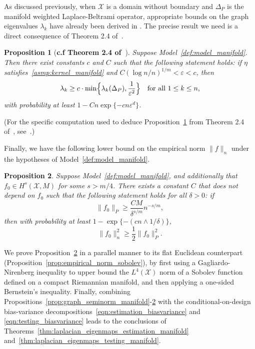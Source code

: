 \documentclass[aos]{imsart}
\theoremstyle{plain}
\newtheorem{proposition}{Proposition}
\theoremstyle{definition}
\theoremstyle{remark}
\newcommand{\mc}[1]{\mathcal{#1}}
\newcommand{\1}{\mathbf{1}}
\begin{document}
As discussed previously, when $\mc{X}$ is a domain without boundary and $\Delta_P$ is the manifold weighted Laplace-Beltrami operator, appropriate bounds on the graph eigenvalues $\lambda_k$ have already been derived in \citep{burago2014,trillos2019,garciatrillos19}. The precise result we need is a direct consequence of Theorem 2.4 of~\citep{calder2019}.
\begin{proposition}[\textbf{c.f Theorem 2.4 of~\citep{calder2019}}]
	\label{prop:graph_eigenvalue_manifold}
	Suppose Model~\ref{def:model_manifold}. Then there exist constants $c$ and $C$ such that the following statement holds: if $\eta$ satisfies~\ref{asmp:kernel_manifold} and $C(\log n/n)^{1/m} < \varepsilon < c$, then
	\begin{equation}
	\label{eqn:graph_eigenvalue_manifold}
	\lambda_k \geq c \cdot \min\Bigl\{\lambda_k(\Delta_P), \frac{1}{\varepsilon^{2}} \Bigr\} \quad \textrm{for all $1 \leq k \leq n$,}
	\end{equation}
	with probability at least $1 - Cn\exp\{-c n\varepsilon^d\}$. 
\end{proposition}
(For the specific computation used to deduce Proposition~\ref{prop:graph_eigenvalue_manifold} from Theorem 2.4 of~\citep{calder2019}, see~\cite{green2021}.)

Finally, we have the following lower bound on the empirical norm $\|f\|_n$ under the hypotheses of Model~\ref{def:model_manifold}. 
\begin{proposition}
	\label{prop:empirical_norm_sobolev_manifold}
	Suppose Model~\ref{def:model_manifold}, and additionally that $f_0 \in H^s(\mc{X},M)$ for some $s > m/4$. There exists a constant $C$ that does not depend on $f_0$ such that the following statement holds for all $\delta > 0$:  if
	\begin{equation}
	\label{eqn:empirical_norm_sobolev_manifold_1}
	\|f_0\|_{P} \geq \frac{C M}{\delta^{s/m}}n^{-s/m},
	\end{equation}
	then with probability at least $1 - \exp\{-(cn \wedge 1/\delta)\}$,
	\begin{equation}
	\label{eqn:empirical_norm_sobolev_manifold}
	\|f_0\|_n^2 \geq \frac{1}{2} \|f_0\|_P^2.
	\end{equation}
\end{proposition}
We prove Proposition~\ref{prop:empirical_norm_sobolev_manifold} in a parallel manner to its flat Euclidean counterpart (Proposition~\ref{prop:empirical_norm_sobolev}), by first using a Gagliardo-Nirenberg inequality to upper bound the $L^4(\mc{X})$ norm of a Sobolev function defined on a compact Riemannian manifold, and then applying a one-sided Bernstein's inequality. Finally, combining Propositions~\ref{prop:graph_seminorm_manifold}-\ref{prop:empirical_norm_sobolev_manifold} with the conditional-on-design bias-variance decompositions~\eqref{eqn:estimation_biasvariance} and \eqref{eqn:testing_biasvariance} leads to the conclusions of Theorems~\ref{thm:laplacian_eigenmaps_estimation_manifold} and~\ref{thm:laplacian_eigenmaps_testing_manifold}. 
\end{document}
